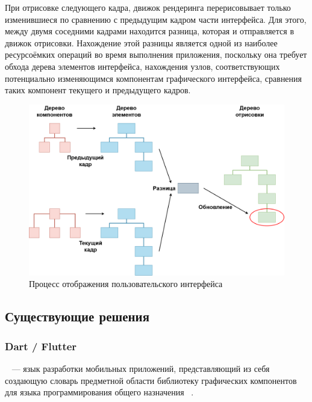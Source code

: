 При отрисовке следующего кадра, движок рендеринга перерисовывает только
изменившиеся по сравнению с предыдущим кадром части интерфейса. Для этого,
между двумя соседними кадрами находится разница, которая и отправляется в
движок отрисовки. Нахождение этой разницы является одной из наиболее
ресурсоёмких операций во время выполнения приложения, поскольку она требует
обхода дерева элементов интерфейса, нахождения узлов, соответствующих
потенциально изменяющимся компонентам графического интерфейса, сравнения
таких компонент текущего и предыдущего кадров.

\begin{figure}[H]
\centering
\includegraphics[width=\linewidth,height=0.9\linewidth,keepaspectratio]{resources/rendering-pipeline.png}
\caption{Процесс отображения пользовательского интерфейса}
\label{render-pipeline}
\end{figure}


\subsection{Существующие решения}
\subsubsection*{Dart / Flutter}
~\cite{flutter-homepage} --- язык разработки
мобильных приложений, представляющий из себя создающую словарь предметной
области библиотеку графических компонентов для языка
программирования общего назначения ~\cite{dart-homepage}.

